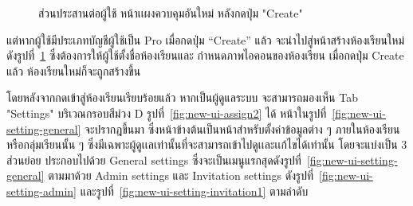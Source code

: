 \documentclass[12pt,one side,openright,a4paper]{cpe-thesis-th}
\newcommand{\thaijustify}[1]{%
  \par\hspace{30pt}\justifying
  #1
}
\begin{document}
                \begin{figure}[H]
                    \centering
                    \caption[ส่วนประสานต่อผู้ใช้ หน้าเเผงควบคุมอันใหม่ (กดปุ่ม "Create")]{ส่วนประสานต่อผู้ใช้ หน้าเเผงควบคุมอันใหม่ หลังกดปุ่ม "Create"}
                    \label{fig:new-ui-dashboard3}
                \end{figure}
                \thaijustify{
                    แต่หากผู้ใช้มีประเภทบัญชีผู้ใช้เป็น Pro เมื่อกดปุ่ม “Create” แล้ว จะนำไปสู่หน้าสร้างห้องเรียนใหม่ ดังรูปที่~\ref{fig:new-ui-dashboard3} ซึ่งต้องการให้ผู้ใช้ตั้งชื่อห้องเรียนและ   กำหนดภาพไอคอนของห้องเรียน เมื่อกดปุ่ม Create แล้ว ห้องเรียนใหม่ก็จะถูกสร้างขึ้น 
                }
                \pagebreak
                \thaijustify{
                     โดยหลังจากกดเข้าสู่ห้องเรียนเรียบร้อยแล้ว หากเป็นผู้ดูแลระบบ จะสามารถมองเห็น Tab "Settings" บริเวณกรอบสีม่วง D รูปที่~\ref{fig:new-ui-assign2} ได้ หน้าในรูปที่~\ref{fig:new-ui-setting-general} จะปรากฎขึ้นมา ซึ่งหน้าข้างต้นเป็นหน้าสำหรับตั้งค่าข้อมูลต่าง ๆ ภายในห้องเรียนหรือกลุ่มเรียนนั้น ๆ ซึ่งมีเฉพาะผู้ดูเเลเท่านั้นที่จะสามารถเข้าไปดูเเละเเก้ไขได้เท่านั้น โดยจะแบ่งเป็น 3 ส่วนย่อย ประกอบไปด้วย General settings ซึ่งจะเป็นเมนูแรกสุดดังรูปที่~\ref{fig:new-ui-setting-general} ตามมาด้วย Admin settings และ Invitation settings ดังรูปที่~\ref{fig:new-ui-setting-admin} และรูปที่~\ref{fig:new-ui-setting-invitation1} ตามลำดับ
                }
            
\end{document}
